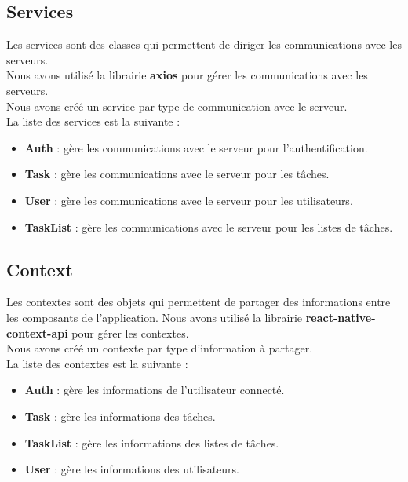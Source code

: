 \documentclass[12pt]{article}
\begin{document}
    \subsection{Services}\label{subsec:services}
    Les services sont des classes qui permettent de diriger les communications avec les serveurs.\\
    Nous avons utilisé la librairie \textbf{axios} pour gérer les communications avec les serveurs.\\
    Nous avons créé un service par type de communication avec le serveur.\\
    La liste des services est la suivante :
    \begin{itemize}
        \item \textbf{Auth} : gère les communications avec le serveur pour l'authentification.
        \item \textbf{Task} : gère les communications avec le serveur pour les tâches.
        \item \textbf{User} : gère les communications avec le serveur pour les utilisateurs.
        \item \textbf{TaskList} : gère les communications avec le serveur pour les listes de tâches.
    \end{itemize}

    \subsection{Context}\label{subsec:context}
    Les contextes sont des objets qui permettent de partager des informations entre les composants de l'application.
    Nous avons utilisé la librairie \textbf{react-native-context-api} pour gérer les contextes.\\
    Nous avons créé un contexte par type d'information à partager.\\
    La liste des contextes est la suivante :
    \begin{itemize}
        \item \textbf{Auth} : gère les informations de l'utilisateur connecté.
        \item \textbf{Task} : gère les informations des tâches.
        \item \textbf{TaskList} : gère les informations des listes de tâches.
        \item \textbf{User} : gère les informations des utilisateurs.
    \end{itemize}
\end{document}
